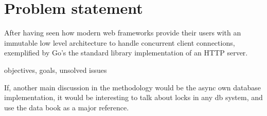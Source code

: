 \section{Problem statement}
After having seen how modern web frameworks provide their users with an immutable low level architecture to handle concurrent client connections, exemplified by Go's the standard library implementation of an HTTP server.

objectives, goals, unsolved issues

If, another main discussion in the methodology would be the async own database implementation, it would be interesting to talk about locks in any db system, and use the data book as a major reference.